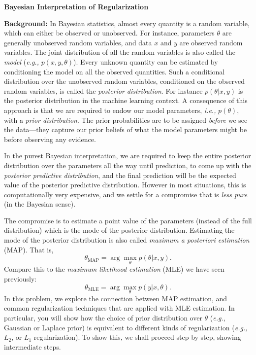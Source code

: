 \clearpage
\item {} {\bf Bayesian Interpretation of Regularization}

\textbf{Background: }
In Bayesian statistics, almost every quantity is a random variable, which
can either be observed or unobserved. For instance, parameters $\theta$ are
generally unobserved random variables, and data $x$ and $y$ are observed
random variables. The joint distribution of all the random variables is
also called the \emph{model} (\emph{e.g.,} $p(x, y, \theta)$). Every unknown quantity can
be estimated by conditioning the model on all the observed quantities. Such
a conditional distribution over the unobserved random variables, conditioned
on the observed random variables, is called the \emph{posterior distribution}.
For instance $p(\theta | x, y)$ is the posterior distribution in the
machine learning context. A consequence of this approach is that we are
required to endow our model parameters, \emph{i.e.,} $p(\theta)$, with a \emph{prior distribution}.
The prior probabilities are to be assigned \emph{before} we see the data---they capture our prior beliefs of what the model parameters might be
before observing any evidence.

In the purest Bayesian interpretation, we are required to keep the entire
posterior distribution over the parameters all the way until prediction, to
come up with the \emph{posterior predictive distribution}, and the final prediction
will be the expected value of the posterior predictive distribution. However
in most situations, this is computationally very expensive, and we settle for
a compromise that is \emph{less pure} (in the Bayesian sense).

The compromise is to estimate a point value of the parameters (instead of the
full distribution) which is the mode of the posterior distribution. Estimating
the mode of the posterior distribution is also called
\emph{maximum a posteriori estimation} (MAP). That is, 
$$\theta_{\text{MAP}} = \arg\max_\theta p(\theta|x,y).$$
Compare this to the \emph{maximum likelihood estimation} (MLE) we have
seen previously:
$$\theta_{\text{MLE}} = \arg\max_\theta p(y|x,\theta).$$
In this problem, we explore the connection between MAP estimation, and common
regularization techniques that are applied with MLE estimation.
In particular, you will show how the choice of prior distribution over $\theta$ (\emph{e.g.,}
Gaussian or Laplace prior)
is equivalent to different kinds of regularization (\emph{e.g.,} $L_2$, or $L_1$
regularization). To show this, we shall proceed step by step, showing intermediate
steps.

